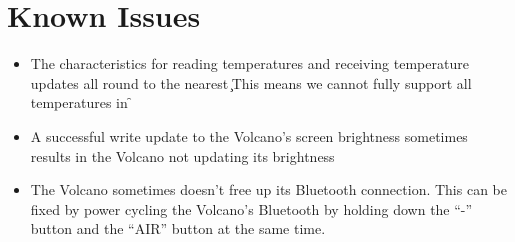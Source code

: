 \section{Known Issues}
\begin{itemize}
    \item The characteristics for reading temperatures and receiving temperature updates all round to the nearest \c
        \subitem This means we cannot fully support all temperatures in \f
    \item A successful write update to the Volcano's screen brightness sometimes results in the Volcano not updating its brightness
    \item The Volcano sometimes doesn't free up its Bluetooth connection. This can be fixed by power cycling the Volcano's Bluetooth by holding down the ``-'' button and the ``AIR'' button at the same time.
\end{itemize}

